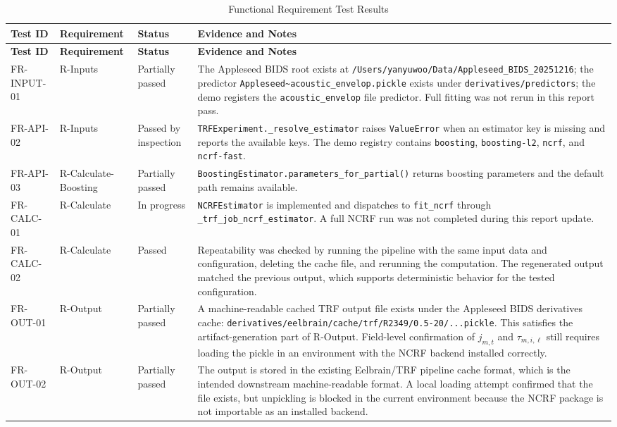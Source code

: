 \documentclass[12pt, titlepage]{article}
\begin{document}
\begin{longtable}{p{}p{}p{}p{}}
\caption{Functional Requirement Test Results}\label{tab:functional-results}\\
\toprule
\textbf{Test ID} & \textbf{Requirement} & \textbf{Status} & \textbf{Evidence and Notes}\\
\midrule
\endfirsthead
\toprule
\textbf{Test ID} & \textbf{Requirement} & \textbf{Status} & \textbf{Evidence and Notes}\\
\midrule
\endhead
FR-INPUT-01 & R-Inputs & Partially passed & The Appleseed BIDS root exists at \texttt{/Users/yanyuwoo/Data/Appleseed\_BIDS\_20251216}; the predictor \texttt{Appleseed\textasciitilde acoustic\_envelop.pickle} exists under \texttt{derivatives/predictors}; the demo registers the \texttt{acoustic\_envelop} file predictor. Full fitting was not rerun in this report pass.\\
FR-API-02 & R-Inputs & Passed by inspection & \texttt{TRFExperiment.\_resolve\_estimator} raises \texttt{ValueError} when an estimator key is missing and reports the available keys. The demo registry contains \texttt{boosting}, \texttt{boosting-l2}, \texttt{ncrf}, and \texttt{ncrf-fast}.\\
FR-API-03 & R-Calculate-Boosting & Partially passed & \texttt{BoostingEstimator.parameters\_for\_partial()} returns boosting parameters and the default path remains available.\\
FR-CALC-01 & R-Calculate & In progress & \texttt{NCRFEstimator} is implemented and dispatches to \texttt{fit\_ncrf} through \texttt{\_trf\_job\_ncrf\_estimator}. A full NCRF run was not completed during this report update.\\
FR-CALC-02 & R-Calculate & Passed & Repeatability was checked by running the pipeline with the same input data and configuration, deleting the cache file, and rerunning the computation. The regenerated output matched the previous output, which supports deterministic behavior for the tested configuration.\\
FR-OUT-01 & R-Output & Partially passed & A machine-readable cached TRF output file exists under the Appleseed BIDS derivatives cache: \texttt{derivatives/eelbrain/cache/trf/R2349/0.5-20/...pickle}. This satisfies the artifact-generation part of R-Output. Field-level confirmation of $j_{m,t}$ and $\tau_{m,i,\ell}$ still requires loading the pickle in an environment with the NCRF backend installed correctly.\\
FR-OUT-02 & R-Output & Partially passed & The output is stored in the existing Eelbrain/TRF pipeline cache format, which is the intended downstream machine-readable format. A local loading attempt confirmed that the file exists, but unpickling is blocked in the current environment because the NCRF package is not importable as an installed backend.\\
\bottomrule
\end{longtable}
\end{document}
